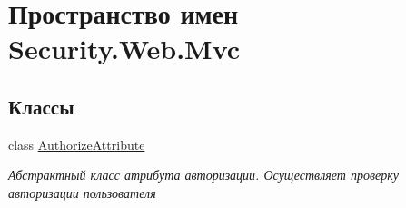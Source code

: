 \hypertarget{namespace_security_1_1_web_1_1_mvc}{}\section{Пространство имен Security.\+Web.\+Mvc}
\label{namespace_security_1_1_web_1_1_mvc}
\subsection*{Классы}
\begin{DoxyCompactItemize}
\item 
class \hyperlink{class_security_1_1_web_1_1_mvc_1_1_authorize_attribute}{Authorize\+Attribute}
\begin{DoxyCompactList}\small\item\em Абстрактный класс атрибута авторизации. Осуществляет проверку авторизации пользователя \end{DoxyCompactList}\end{DoxyCompactItemize}
